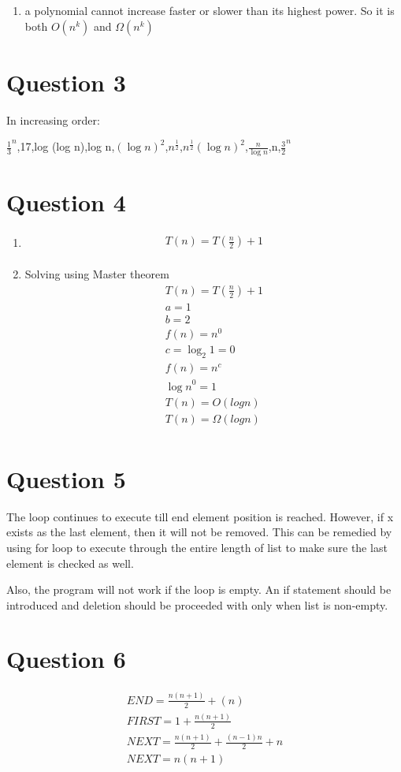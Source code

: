 \documentclass{article}
\begin{document}
\begin{enumerate}
\item a polynomial cannot increase faster or slower than its highest power. So it is both $O(n^k)$ and $\Omega(n^k)$
\end{enumerate}


\section*{Question 3}

In increasing order:

$\frac{1}{3}^n$,17,log (log n),log n,$(\log n) ^2$,$n^{\frac{1}{2}}$,$ n^{\frac{1}{2}}$$(\log n) ^2$,$\frac {n}{\log n}$,n,$\frac {3}{2} ^n$

\section*{Question 4}
\begin{enumerate}
\item 
\begin{align}
T(n)=T(\frac{n}{2})+ 1\\
\end{align}

\item
Solving using Master theorem
\begin{align}
T(n)=T(\frac{n}{2})+ 1\\
a=1\\
b=2\\
f(n)=n^0\\
c=\log_2 1=0\\
f(n)=n^c\\
{\log n}^0=1\\
T(n)=O(log n)\\
T(n)=\Omega(log n)\\
\end{align}
\end{enumerate}



\section*{Question 5}

The loop continues to execute till end element position is reached. However, if x exists as the last element, then it will not be removed.
This can be remedied by using for loop to execute through the entire length of list to make sure the last element is checked as well.

Also, the program will not work if the loop is empty. An if statement should be introduced and deletion should be proceeded with only when list is non-empty.

\section*{Question 6}

 
\begin{align}
END=\frac{n(n+1)}{2}+(n)\\
FIRST=1+ \frac{n (n+1)}{2}\\
NEXT= \frac{n(n+1)}{2}+\frac{(n-1)n}{2}+n\\
NEXT=n(n+1)\\
\end{align}
\end{document}
